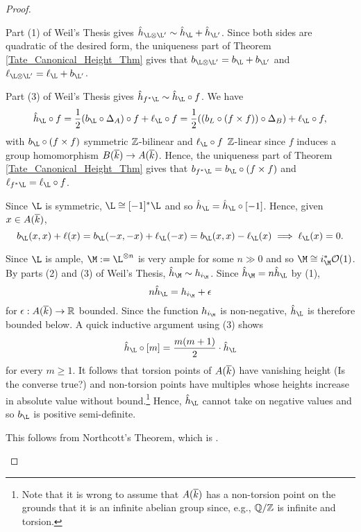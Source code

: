 \documentclass[11pt]{article}
\begin{document}
\begin{proof}
\begin{enum}{\arabic}
\item Part (1) of Weil's Thesis gives $\hat{h}_{\L\tensor\L'}\sim\hat{h}_{\L}+\hat{h}_{\L'}$. Since both sides are quadratic of the desired form, the uniqueness part of Theorem \ref{Tate_Canonical_Height_Thm} gives that $b_{\L\tensor\L'}=b_{\L}+b_{\L'}$ and $\l_{\L\tensor\L'}=\l_{\L}+b_{\L'}$.

\item Part (3) of Weil's Thesis gives $\hat{h}_{f^*\L}\sim\hat{h}_{\L}\circ f$. We have
\begin{align*}
\hat{h}_{\L}\circ f
=\df{1}{2}(b_{\L}\circ\Delta_A)\circ f+\l_{\L}\circ f
=\df{1}{2}((b_{L}\circ(f\times f))\circ\Delta_B)+\l_{\L}\circ f,
\end{align*}
with $b_{\L}\circ(f\times f)$ symmetric $\mathbb{Z}$-bilinear and $\l_{\L}\circ f$ $\mathbb{Z}$-linear since $f$ induces a group homomorphism $B(\overline{k})\to A(\overline{k})$. Hence, the uniqueness part of Theorem \ref{Tate_Canonical_Height_Thm} gives that $b_{f^*\L}=b_{\L}\circ(f\times f)$ and $\l_{f^*\L}=\l_{\L}\circ f$.

\item Since $\L$ is symmetric, $\L\iso[-1]^*\L$ and so $\hat{h}_{\L}=\hat{h}_{\L}\circ[-1]$. Hence, given $x\in A(\overline{k})$, 
$$b_{\L}(x,x)+\l(x)=b_{\L}(-x,-x)+\l_{\L}(-x)=b_{\L}(x,x)-\l_{\L}(x)\implies\l_{\L}(x)=0.$$

\item Since $\L$ is ample, $\M:=\L^{\tensor n}$ is very ample for some $n\gg0$ and so $\M\iso i_{\M}^*\O(1)$. By parts (2) and (3) of Weil's Thesis, $\hat{h}_{\M}\sim h_{i_{\M}}$. Since $\hat{h}_{\M}=n\hat{h}_{\L}$ by (1), 
$$n\hat{h}_{\L}=h_{i_{\M}}+\eps$$
for $\epsilon: A(\overline{k})\to\mathbb{R}$ bounded. Since the function $h_{i_{\M}}$ is non-negative, $\hat{h}_{\L}$ is therefore bounded below. A quick inductive argument using (3) shows 
$$\hat{h}_{\L}\circ[m]=\df{m(m+1)}{2}\cdot\hat{h}_{\L}$$
for every $m\geq1$. It follows that torsion points of $A(\overline{k})$ have vanishing height (Is the converse true?) and non-torsion points have multiples whose heights increase in absolute value without bound.\footnote{Note that it is wrong to assume that $A(\overline{k})$ has a non-torsion point on the grounds that it is an infinite abelian group since, e.g., $\mathbb{Q}/\mathbb{Z}$ is infinite and torsion.} Hence, $\hat{h}_{\L}$ cannot take on negative values and so $b_{\L}$ is positive semi-definite.

\item This follows from Northcott's Theorem, which is \cite[\textrm{Thm 10.1.6}]{Conrad}. \qedhere
\end{enum}
\end{proof}
\end{document}
